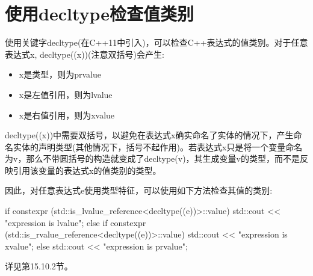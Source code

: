 \section{使用decltype检查值类别}
使用关键字decltype(在C++11中引入)，可以检查C++表达式的值类别。对于任意表达式x, decltype((x))(注意双括号)会产生:

\begin{itemize}
\item 
x是类型，则为prvalue

\item
x是左值引用，则为lvalue

\item
x是右值引用，则为xvalue
\end{itemize}

decltype((x))中需要双括号，以避免在表达式x确实命名了实体的情况下，产生命名实体的声明类型(其他情况下，括号不起作用)。若表达式x只是将一个变量命名为v，那么不带圆括号的构造就变成了decltype(v)，其生成变量v的类型，而不是反映引用该变量的表达式x的值类别的类型。

因此，对任意表达式e使用类型特征，可以使用如下方法检查其值的类别:

\begin{cpp}
if constexpr (std::is_lvalue_reference<decltype((e))>::value) {
	std::cout << "expression is lvalue\n";
}
else if constexpr (std::is_rvalue_reference<decltype((e))>::value) {
	std::cout << "expression is xvalue\n";
}
else {
	std::cout << "expression is prvalue\n";
}
\end{cpp}

详见第15.10.2节。







